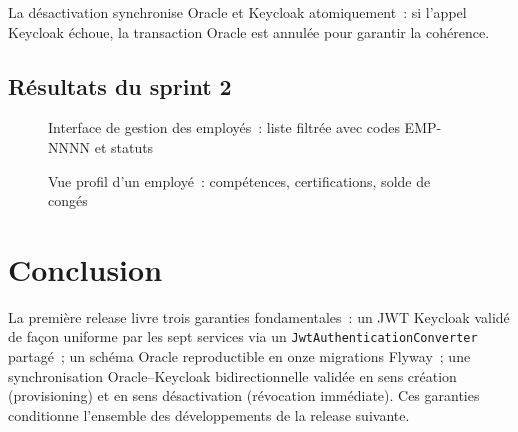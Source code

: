 La désactivation synchronise Oracle et Keycloak atomiquement~: si l'appel Keycloak
échoue, la transaction Oracle est annulée pour garantir la cohérence.

\subsection{Résultats du sprint 2}

\begin{figure}[H]
  \centering
  \caption{Interface de gestion des employés~: liste filtrée avec codes EMP-NNNN et statuts}
  \label{fig:s2_list}
\end{figure}

\begin{figure}[H]
  \centering
  \caption{Vue profil d'un employé~: compétences, certifications, solde de congés}
  \label{fig:s2_profil}
\end{figure}

\section{Conclusion}

La première release livre trois garanties fondamentales~: un JWT Keycloak validé
de façon uniforme par les sept services via un \texttt{JwtAuthenticationConverter}
partagé~; un schéma Oracle reproductible en onze migrations Flyway~; une
synchronisation Oracle--Keycloak bidirectionnelle validée en sens création
(provisioning) et en sens désactivation (révocation immédiate). Ces garanties
conditionne l'ensemble des développements de la release suivante.
